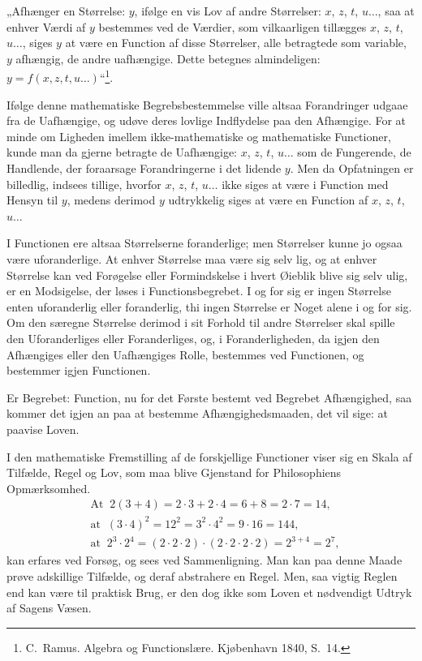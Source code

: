 \documentclass[12pt]{book}
\newcommand{\opage}[1]{\marginnote{\footnotesize\textit{[#1]}}}
\begin{document}
„Afhænger en Størrelse: $y$, ifølge en vis Lov af andre Størrelser: $x$, $z$,
$t$, $u\ldots$, saa at enhver Værdi af $y$ bestemmes ved de Værdier, som
vilkaarligen tillægges $x$, $z$, $t$, $u\ldots$, siges $y$ at være en Function
af disse Størrelser, alle betragtede som variable, $y$ afhængig, de andre
uafhængige. Dette betegnes almindeligen: $y = f(x,z,t,u\ldots)$“\footnote{C.\
Ramus. Algebra og Functionslære. Kjøbenhavn 1840, S.\ 14.}.

Ifølge denne mathematiske Begrebsbestemmelse ville altsaa Forandringer udgaae
fra de Uafhængige, og udøve deres lovlige Indflydelse paa den Afhængige. For at
minde om Ligheden imellem ikke-mathematiske og mathematiske Functioner, kunde
man da gjerne betragte de Uafhængige: $x$, $z$, $t$, $u\ldots$ som de
Fungerende, de Handlende, der foraarsage Forandringerne i det lidende $y$. Men
da Opfatningen er billedlig, indsees tillige, hvorfor $x$, $z$, $t$, $u\ldots$
ikke siges at være i Function med Hensyn til $y$, medens derimod $y$
udtrykkelig siges at være en Function af $x$, $z$, $t$, $u\ldots$

I Functionen ere altsaa Størrelserne foranderlige; men Størrelser kunne jo
ogsaa være uforanderlige. At enhver Størrelse maa være sig selv lig, og at
enhver Størrelse kan ved Forøgelse eller Formindskelse i hvert Øieblik blive
\opage{7} sig selv ulig, er en Modsigelse, der løses i Functionsbegrebet. I og for sig er
ingen Størrelse enten uforanderlig eller foranderlig, thi ingen Størrelse er
Noget alene i og for sig. Om den særegne Størrelse derimod i sit Forhold til
andre Størrelser skal spille den Uforanderliges eller Foranderliges, og, i
Foranderligheden, da igjen den Afhængiges eller den Uafhængiges Rolle,
bestemmes ved Functionen, og bestemmer igjen Functionen.

Er Begrebet: Function, nu for det Første bestemt ved Begrebet Afhængighed, saa
kommer det igjen an paa at bestemme Afhængighedsmaaden, det vil sige: at paavise
Loven.

I den mathematiske Fremstilling af de forskjellige Functioner viser sig en
Skala af Tilfælde, Regel og Lov, som maa blive Gjenstand for Philosophiens
Opmærksomhed.
\[
\begin{aligned}
&\text{At }\ 2(3+4) = 2\cdot 3 + 2\cdot 4 = 6+8 = 2\cdot 7 = 14,\\
&\text{at }\ (3\cdot 4)^{2} = 12^{2} = 3^{2}\cdot 4^{2} = 9\cdot 16 = 144,\\
&\text{at }\ 2^{3}\cdot 2^{4} = (2\cdot 2\cdot 2)\cdot(2\cdot 2\cdot 2\cdot 2)
      = 2^{3+4} = 2^{7},
\end{aligned}
\]
kan erfares ved Forsøg, og sees ved Sammenligning. Man kan paa denne Maade prøve
adskillige Tilfælde, og deraf abstrahere en Regel. Men, saa vigtig Reglen end
kan være til praktisk Brug, er den dog ikke som Loven et nødvendigt Udtryk af
Sagens Væsen.
\end{document}
